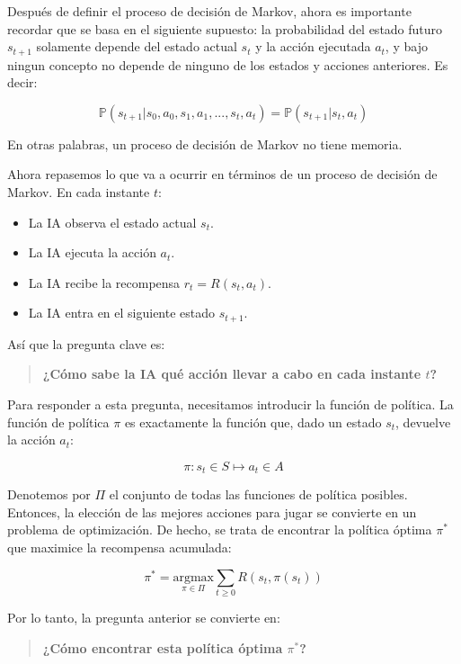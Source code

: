 \documentclass[
]{book}
\providecommand{\tightlist}{%
  \setlength{\itemsep}{0pt}\setlength{\parskip}{0pt}}
\begin{document}
Después de definir el proceso de decisión de Markov, ahora es importante recordar que se basa en el siguiente supuesto: la probabilidad del estado futuro \(s_{t + 1}\) solamente depende del estado actual \(s_t\) y la acción ejecutada \(a_t\), y bajo ningun concepto no depende de ninguno de los estados y acciones anteriores. Es decir:

\[\mathbb{P}(s_{t+1}|s_0,a_0,s_1,a_1,...,s_t,a_t) = \mathbb{P}(s_{t+1}|s_t,a_t)\]

En otras palabras, un proceso de decisión de Markov no tiene memoria.

\newpage

Ahora repasemos lo que va a ocurrir en términos de un proceso de decisión de Markov. En cada instante \(t\):

\begin{itemize}
\tightlist
\item
  La IA observa el estado actual \(s_t\).
\item
  La IA ejecuta la acción \(a_t\).
\item
  La IA recibe la recompensa \(r_t = R(s_t, a_t)\).
\item
  La IA entra en el siguiente estado \(s_{t+1}\).
\end{itemize}

Así que la pregunta clave es:

\begin{quote}
\textbf{¿Cómo sabe la IA qué acción llevar a cabo en cada instante \(t\)?}
\end{quote}

Para responder a esta pregunta, necesitamos introducir la función de política. La función de política \(\pi\) es exactamente la función que, dado un estado \(s_t\), devuelve la acción \(a_t\):

\[\pi: s_t \in S \mapsto a_t \in A\]

Denotemos por \(\Pi\) el conjunto de todas las funciones de política posibles. Entonces, la elección de las mejores acciones para jugar se convierte en un problema de optimización. De hecho, se trata de encontrar la política óptima \(\pi^*\) que maximice la recompensa acumulada:

\[\pi^* = \underset{\pi \in \Pi}{\textrm{argmax}} \sum_{t \ge 0} R(s_t,\pi(s_t))\]

Por lo tanto, la pregunta anterior se convierte en:

\begin{quote}
\textbf{¿Cómo encontrar esta política óptima \(\pi^*\)?}
\end{quote}
\end{document}
